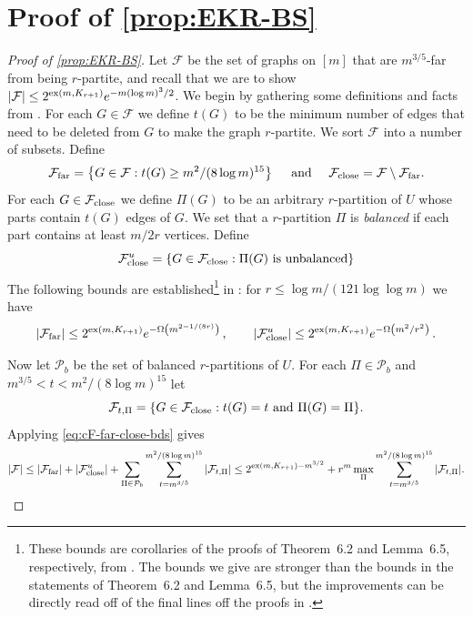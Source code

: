 \documentclass[11pt]{article}
\theoremstyle{definition}
\theoremstyle{remark}
\newcommand{\cF}{\mathcal{F}}
\newcommand{\cP}{\mathcal{P}}
\begin{document}
\appendix
\section{Proof of \texorpdfstring{\cref{prop:EKR-BS}}{Proposition 18}} \label{sec:far}

\begin{proof}[Proof of \cref{prop:EKR-BS}]
   Let $\cF$ be the set of graphs on $[m]$ that are $m^{3/5}$-far from being $r$-partite, and recall that we are to show $|\cF| \le 2^{{\rm ex}(m, K_{r+1})}  e^{ - m (\log m)^3/2}$. We begin by gathering some definitions and facts from \cite{balogh2019efficient}.  
    For each $ G \in \cF$ we define $ t(G)$ to be the minimum number of
    edges that need to be deleted from $G$ to make the graph $r$-partite.
    We sort $\cF$ into a number of subsets.
    Define
    \[
    \cF_{\rm far} = \left\{ G \in \cF: t(G) \ge m^2/ ( 8 \log m)^{15}  \right\} 
    \ \ \ \text{ and } \ \ \ \cF_{\rm close} = \cF \setminus \cF_{\rm far}.  \]
    For each $ G \in \cF_{\rm close}$ we define $ \Pi(G)$ to be an arbitrary
    $r$-partition of $U$ whose parts contain $ t(G)$ edges of $G$. We
    set that a $r$-partition $\Pi$ is {\em balanced} if each part contains
    at least $m/2r$ vertices. Define
    \[ \cF_{\rm close}^u = \{ G \in \cF_{\rm close}: \Pi(G) \text{ is unbalanced}\}\]
    The following bounds are established\footnote{These bounds are corollaries of the proofs of Theorem~6.2 and Lemma~6.5, respectively, from \cite{balogh2019efficient}. The bounds we give are stronger than the bounds in the statements of Theorem~6.2 and Lemma~6.5, but the improvements can be directly read off of the final lines off the proofs in \cite{balogh2019efficient}.} in \cite{balogh2019efficient}: for $r \leq \log m / (121 \log\log m)$ we have 
    \begin{equation}
     | \cF_{\rm far} |  \le 2^{ {\rm ex}(m, K_{r+1})} e^{ - \Omega\left( m^{2 - 1 /(8r)}   \right)}\,, \qquad  
     | \cF_{\rm close}^u | \le 2^{ {\rm ex}(m, K_{r+1})} e^{ - \Omega\left( m^{2}/r^2   \right)}\,. \label{eq:cF-far-close-bds}
    \end{equation}
    
    
    Now let $ \cP_b$ be the set of balanced $r$-partitions of $ U$. For each $ \Pi \in \cP_b$ and $ m^{3/5} < t < m^2/( 8 \log m)^{15}$ let
    \[ \cF_{t, \Pi} = \{ G \in \cF_{\rm close}: t(G) = t \text { and } \Pi(G) = \Pi  \}. \]
    Applying \eqref{eq:cF-far-close-bds} gives 
    \begin{equation}
        |\cF| \le | \cF_{\rm far}| + | \cF_{\rm close}^u| + \sum_{ \Pi \in \cP_b} \sum_{t= m^{3/5}}^{ m^2/ (8 \log m)^{15}}| \cF_{t, \Pi}| 
    \le 2^{{ \rm ex}(m, K_{r+1}) - m^{3/2}} + r^m \max_{\Pi}\sum_{t= m^{3/5}}^{ m^2/ (8 \log m)^{15}}| \cF_{t, \Pi}| . \label{eq:cF-first-bd}
    \end{equation} 
    

\end{proof}
\end{document}
